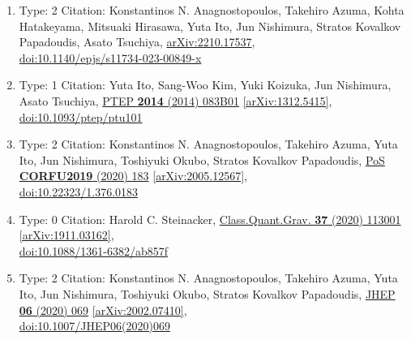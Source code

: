 \documentclass[a4paper,10pt]{article}
\begin{document}
\begin{enumerate}
\begin{enumerate}
  \item Type: 2 Citation: Konstantinos N. Anagnostopoulos, Takehiro Azuma, Kohta Hatakeyama, Mitsuaki Hirasawa, Yuta Ito, Jun Nishimura, Stratos Kovalkov Papadoudis, Asato Tsuchiya, \href{https://arxiv.org/abs/2210.17537}{arXiv:2210.17537},\\\href{https://www.doi.org/10.1140/epjs/s11734-023-00849-x}{doi:10.1140/epjs/s11734-023-00849-x}
  \item Type: 1 Citation: Yuta Ito, Sang-Woo Kim, Yuki Koizuka, Jun Nishimura, Asato Tsuchiya, \href{https://www.doi.org/10.1093/ptep/ptu101}{PTEP {\bf 2014} (2014) 083B01}  \href{https://arxiv.org/abs/1312.5415}{[arXiv:1312.5415]},\\\href{https://www.doi.org/10.1093/ptep/ptu101}{doi:10.1093/ptep/ptu101}
  \item Type: 2 Citation: Konstantinos N. Anagnostopoulos, Takehiro Azuma, Yuta Ito, Jun Nishimura, Toshiyuki Okubo, Stratos Kovalkov Papadoudis, \href{https://www.doi.org/10.22323/1.376.0183}{PoS {\bf CORFU2019} (2020) 183}  \href{https://arxiv.org/abs/2005.12567}{[arXiv:2005.12567]},\\\href{https://www.doi.org/10.22323/1.376.0183}{doi:10.22323/1.376.0183}
  \item Type: 0 Citation: Harold C. Steinacker, \href{https://www.doi.org/10.1088/1361-6382/ab857f}{Class.Quant.Grav. {\bf 37} (2020) 113001}  \href{https://arxiv.org/abs/1911.03162}{[arXiv:1911.03162]},\\\href{https://www.doi.org/10.1088/1361-6382/ab857f}{doi:10.1088/1361-6382/ab857f}
  \item Type: 2 Citation: Konstantinos N. Anagnostopoulos, Takehiro Azuma, Yuta Ito, Jun Nishimura, Toshiyuki Okubo, Stratos Kovalkov Papadoudis, \href{https://www.doi.org/10.1007/JHEP06(2020)069}{JHEP {\bf 06} (2020) 069}  \href{https://arxiv.org/abs/2002.07410}{[arXiv:2002.07410]},\\\href{https://www.doi.org/10.1007/JHEP06(2020)069}{doi:10.1007/JHEP06(2020)069}

\end{enumerate}
\end{enumerate}
\end{document}
